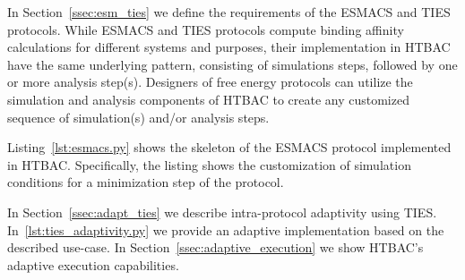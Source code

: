 
In Section~\ref{ssec:esm_ties} we define the requirements of the ESMACS and
TIES protocols. While ESMACS and TIES protocols compute binding affinity
calculations for different systems and purposes, their implementation in
HTBAC have the same underlying pattern, consisting of simulations steps,
followed by one or more analysis step(s). Designers of free energy protocols
can utilize the simulation and analysis components of HTBAC to create any
customized sequence of simulation(s) and/or analysis steps.

Listing~\ref{lst:esmacs.py} shows the skeleton of the ESMACS protocol
implemented in HTBAC. Specifically, the listing shows the customization of
simulation conditions for a minimization step of the protocol.




In Section~\ref{ssec:adapt_ties} we describe intra-protocol adaptivity using 
TIES. In~\ref{lst:ties_adaptivity.py} we provide an adaptive implementation 
based on the described use-case. In Section~\ref{ssec:adaptive_execution} we 
show HTBAC's adaptive execution capabilities. 


